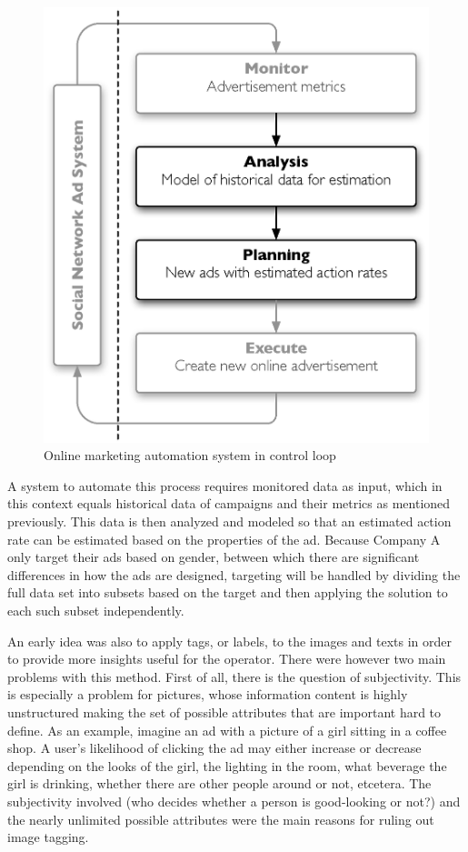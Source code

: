 \documentclass{sig-alternate}
\begin{document}
\begin{figure}[htb] \centering \includegraphics[width=\columnwidth]{mape-marketing.eps}
	\caption{Online marketing automation system in control loop}
	\label{fig:MAPEMarketing}
\end{figure}

A system to automate this process requires monitored data as input, which in this context equals historical data of campaigns and their metrics as mentioned previously. This data is then analyzed and modeled so that an estimated action rate can be estimated based on the properties of the ad. Because Company A only target their ads based on gender, between which there are significant differences in how the ads are designed, targeting will be handled by dividing the full data set into subsets based on the target and then applying the solution to each such subset independently.

An early idea was also to apply tags, or labels, to the images and texts in order to provide more insights useful for the operator. There were however two main problems with this method. First of all, there is the question of subjectivity. This is especially a problem for pictures, whose information content is highly unstructured making the set of possible attributes that are important hard to define. As an example, imagine an ad with a picture of a girl sitting in a coffee shop. A user's likelihood of clicking the ad may either increase or decrease depending on the looks of the girl, the lighting in the room, what beverage the girl is drinking, whether there are other people around or not, etcetera. The subjectivity involved (who decides whether a person is good-looking or not?) and the nearly unlimited possible attributes were the main reasons for ruling out image tagging.
\end{document}
